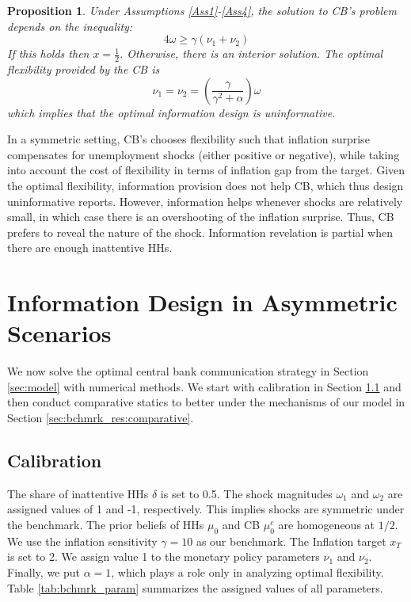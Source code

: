 \documentclass[12pt,a4paper]{article}
\newtheorem{proposition}{Proposition}
\begin{document}
\begin{proposition}
    \label{Prop3}
    Under Assumptions \ref{Ass1}-\ref{Ass4}, the solution to CB's problem depends on the inequality:
    \begin{equation}
    \label{threshold}
        4\omega\geq\gamma(\nu_1+\nu_2)
    \end{equation}
    If this holds then $x=\frac{1}{2}$. Otherwise, there is an interior solution. The optimal flexibility provided by the CB is
    \begin{equation}
        \nu_1=\nu_2=\left(\frac{\gamma}{\gamma^2+\alpha}\right)\omega
    \end{equation}
    which implies that the optimal information design is uninformative.
\end{proposition}
In a symmetric setting, CB's chooses flexibility such that inflation surprise compensates for unemployment shocks (either positive or negative), while taking into account the cost of flexibility in terms of inflation gap from the target. Given the optimal flexibility, information provision does not help CB, which thus design uninformative reports. However, information helps whenever shocks are relatively small, in which case there is an overshooting of the inflation surprise. Thus, CB prefers to reveal the nature of the shock. Information revelation is partial when there are enough inattentive HHs.

\section{Information Design in Asymmetric Scenarios} \label{sec:bchmrk_res}

We now solve the optimal central bank communication strategy in Section \ref{sec:model} with numerical methods. We start with calibration in Section \ref{sec:bchmrk_res:calibration} and then conduct comparative statics to better under the mechanisms of our model in Section \ref{sec:bchmrk_res:comparative}.

\subsection{Calibration} \label{sec:bchmrk_res:calibration}
The share of inattentive HHs $\delta$ is set to 0.5. The shock magnitudes $\omega_1$ and $\omega_2$ are assigned values of 1 and -1, respectively. This implies shocks are symmetric under the benchmark. The prior beliefs of HHs $\mu_0$ and CB $\mu_0^c$ are homogeneous at $1/2$. We use the inflation sensitivity $\gamma=10$ as our benchmark. The Inflation target $x_T$ is set to 2. We assign value 1 to the monetary policy parameters $\nu_1$ and $\nu_2$. Finally, we put $\alpha=1$, which plays a role only in analyzing optimal flexibility. Table \ref{tab:bchmrk_param} summarizes the assigned values of all parameters.
\end{document}
